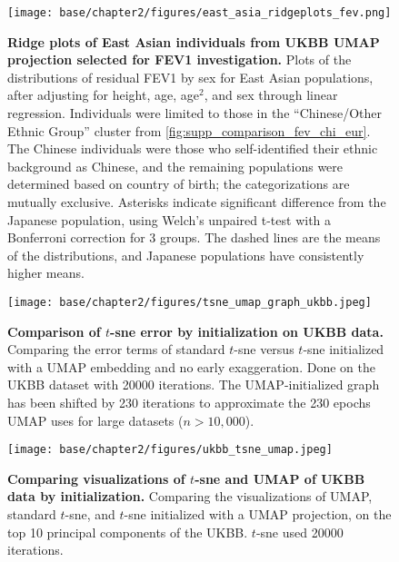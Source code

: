 \newpage

\begin{figure}[ht]
    \centering
    \texttt{[image: base/chapter2/figures/east\_asia\_ridgeplots\_fev.png]}
    \caption[Ridge plots of East Asian individuals from UKBB UMAP projection selected for FEV1 investigation]{\textbf{Ridge plots of East Asian individuals from UKBB UMAP projection selected for FEV1 investigation.} Plots of the distributions of residual FEV1 by sex for East Asian populations, after adjusting for height, age, age$^2$, and sex through linear regression. Individuals were limited to those in the ``Chinese/Other Ethnic Group'' cluster from \ref{fig:supp_comparison_fev_chi_eur}. The Chinese individuals were those who self-identified their ethnic background as Chinese, and the remaining populations were determined based on country of birth; the categorizations are mutually exclusive. Asterisks indicate significant difference from the Japanese population, using Welch's unpaired t-test with a Bonferroni correction for 3 groups. The dashed lines are the means of the distributions, and Japanese populations have consistently higher means.}
    \label{fig:supp_fev_ridgeplots}
\end{figure}

\newpage

\begin{figure}[!htb]
    \centering
    \texttt{[image: base/chapter2/figures/tsne\_umap\_graph\_ukbb.jpeg]}
    \caption[Comparison of $t$-sne error by initialization on UKBB data]{\textbf{Comparison of $t$-sne error by initialization on UKBB data.} Comparing the error terms of standard $t$-sne versus $t$-sne initialized with a UMAP embedding and no early exaggeration. Done on the UKBB dataset with 20000 iterations. The UMAP-initialized graph has been shifted by 230 iterations to approximate the 230 epochs UMAP uses for large datasets ($n>10,000$).}
    \label{fig:supp_tsne_umap_compare_ukbb_graph}
\end{figure}

\newpage

\begin{figure}[!htb]
    \centering
    \texttt{[image: base/chapter2/figures/ukbb\_tsne\_umap.jpeg]}
    \caption[Comparing visualizations of $t$-sne and UMAP of UKBB data by initialization]{\textbf{Comparing visualizations of $t$-sne and UMAP of UKBB data by initialization.} Comparing the visualizations of UMAP, standard $t$-sne, and $t$-sne initialized with a UMAP projection, on the top 10 principal components of the UKBB. $t$-sne used 20000 iterations.}
    \label{fig:supp_tsne_umap_compare_ukbb}
\end{figure}

